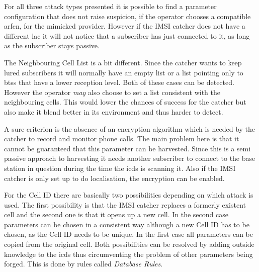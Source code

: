 For all three attack types presented it is possible to find a parameter configuration that does not raise suspicion, if the operator chooses a compatible \gls{arfcn}, \etc for the mimicked provider. 
However if the IMSI catcher does not have a different \gls{lac} it will not notice that a subscriber has just connected to it, as long as the subscriber stays passive.

The Neighbouring Cell List is a bit different.
Since the catcher wants to keep lured subscribers it will normally have an empty list or a list pointing only to \glspl{bts} that have a lower reception level. 
Both of these cases can be detected.
However the operator \emph{may} also choose to set a list consistent with the neighbouring cells.
This would lower the chances of success for the catcher but also make it blend better in its environment and thus harder to detect.

A sure criterion is the absence of an encryption algorithm which is needed by the catcher to record and monitor phone calls.
The main problem here is that it cannot be guaranteed that this parameter can be harvested.
Since this is a semi passive approach to harvesting it needs another subscriber to connect to the base station in question during the time the \gls{icds} is scanning it.
Also if the IMSI catcher is only set up to do localisation, the encryption can be enabled.

For the Cell ID there are basically two possibilities depending on which attack is used.
The first possibility is that the IMSI catcher replaces a formerly existent cell and the second one is that it opens up a new cell.
In the second case parameters can be chosen in a consistent way although a new Cell ID has to be chosen, as the Cell ID needs to be unique.
In the first case all parameters can be copied from the original cell.
Both possibilities can be resolved by adding outside knowledge to the \gls{icds} thus circumventing the problem of other parameters being forged.
This is done by rules called \emph{Database Rules}.

